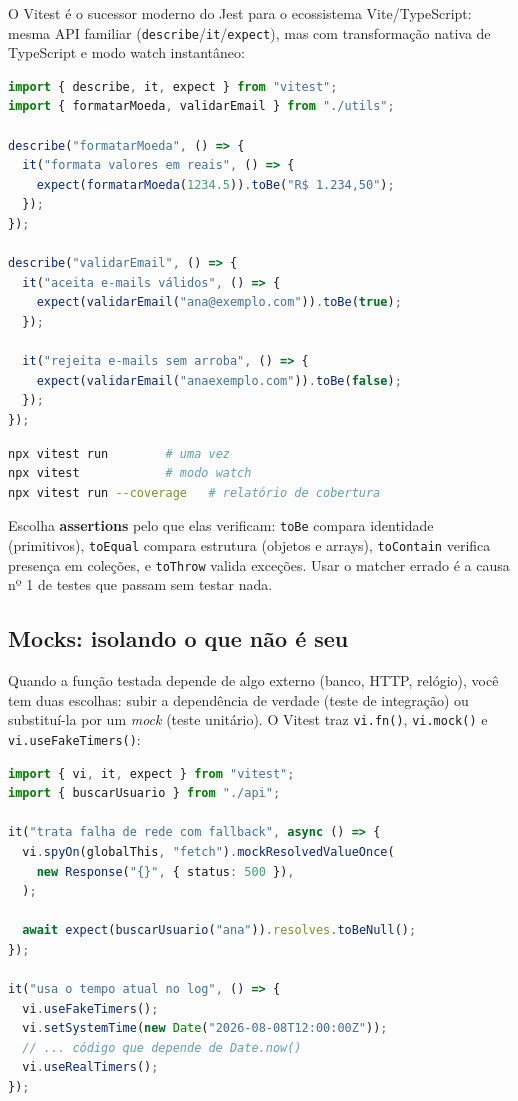 O Vitest é o sucessor moderno do Jest para o ecossistema Vite/TypeScript:
mesma API familiar (\texttt{describe}/\texttt{it}/\texttt{expect}), mas com
transformação nativa de TypeScript e modo watch instantâneo:

\begin{lstlisting}[style=livro, language=TypeScript,
  caption={Teste unitário com Vitest.}, label={list:teste-vitest}]
import { describe, it, expect } from "vitest";
import { formatarMoeda, validarEmail } from "./utils";

describe("formatarMoeda", () => {
  it("formata valores em reais", () => {
    expect(formatarMoeda(1234.5)).toBe("R$ 1.234,50");
  });
});

describe("validarEmail", () => {
  it("aceita e-mails válidos", () => {
    expect(validarEmail("ana@exemplo.com")).toBe(true);
  });

  it("rejeita e-mails sem arroba", () => {
    expect(validarEmail("anaexemplo.com")).toBe(false);
  });
});
\end{lstlisting}

\begin{lstlisting}[style=livro, language=Bash,
  caption={Executando a suíte.}, label={list:teste-run}]
npx vitest run        # uma vez
npx vitest            # modo watch
npx vitest run --coverage   # relatório de cobertura
\end{lstlisting}

\begin{caixadica}
Escolha \textbf{assertions} pelo que elas verificam: \texttt{toBe} compara
identidade (primitivos), \texttt{toEqual} compara estrutura (objetos e
arrays), \texttt{toContain} verifica presença em coleções, e
\texttt{toThrow} valida exceções. Usar o matcher errado é a causa nº 1 de
testes que passam sem testar nada.
\end{caixadica}

\subsection{Mocks: isolando o que não é seu}

Quando a função testada depende de algo externo (banco, HTTP, relógio), você
tem duas escolhas: subir a dependência de verdade (teste de integração) ou
substituí-la por um \emph{mock} (teste unitário). O Vitest traz
\texttt{vi.fn()}, \texttt{vi.mock()} e \texttt{vi.useFakeTimers()}:

\begin{lstlisting}[style=livro, language=TypeScript,
  caption={Mock de fetch e de relógio.}, label={list:teste-mock}]
import { vi, it, expect } from "vitest";
import { buscarUsuario } from "./api";

it("trata falha de rede com fallback", async () => {
  vi.spyOn(globalThis, "fetch").mockResolvedValueOnce(
    new Response("{}", { status: 500 }),
  );

  await expect(buscarUsuario("ana")).resolves.toBeNull();
});

it("usa o tempo atual no log", () => {
  vi.useFakeTimers();
  vi.setSystemTime(new Date("2026-08-08T12:00:00Z"));
  // ... código que depende de Date.now()
  vi.useRealTimers();
});
\end{lstlisting}


